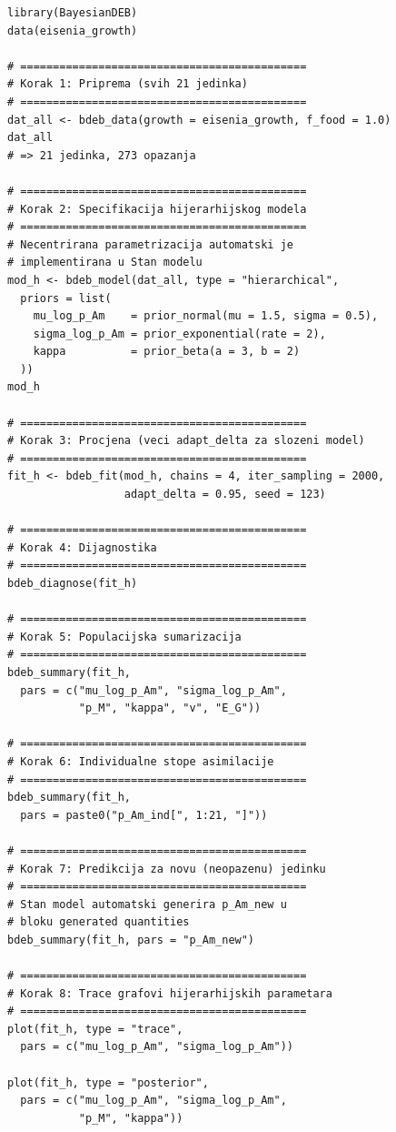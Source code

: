 \documentclass[11pt,a4paper]{article}
\begin{document}
\begin{lstlisting}
library(BayesianDEB)
data(eisenia_growth)

# ============================================
# Korak 1: Priprema (svih 21 jedinka)
# ============================================
dat_all <- bdeb_data(growth = eisenia_growth, f_food = 1.0)
dat_all
# => 21 jedinka, 273 opazanja

# ============================================
# Korak 2: Specifikacija hijerarhijskog modela
# ============================================
# Necentrirana parametrizacija automatski je
# implementirana u Stan modelu
mod_h <- bdeb_model(dat_all, type = "hierarchical",
  priors = list(
    mu_log_p_Am    = prior_normal(mu = 1.5, sigma = 0.5),
    sigma_log_p_Am = prior_exponential(rate = 2),
    kappa          = prior_beta(a = 3, b = 2)
  ))
mod_h

# ============================================
# Korak 3: Procjena (veci adapt_delta za slozeni model)
# ============================================
fit_h <- bdeb_fit(mod_h, chains = 4, iter_sampling = 2000,
                  adapt_delta = 0.95, seed = 123)

# ============================================
# Korak 4: Dijagnostika
# ============================================
bdeb_diagnose(fit_h)

# ============================================
# Korak 5: Populacijska sumarizacija
# ============================================
bdeb_summary(fit_h,
  pars = c("mu_log_p_Am", "sigma_log_p_Am",
           "p_M", "kappa", "v", "E_G"))

# ============================================
# Korak 6: Individualne stope asimilacije
# ============================================
bdeb_summary(fit_h,
  pars = paste0("p_Am_ind[", 1:21, "]"))

# ============================================
# Korak 7: Predikcija za novu (neopazenu) jedinku
# ============================================
# Stan model automatski generira p_Am_new u
# bloku generated quantities
bdeb_summary(fit_h, pars = "p_Am_new")

# ============================================
# Korak 8: Trace grafovi hijerarhijskih parametara
# ============================================
plot(fit_h, type = "trace",
  pars = c("mu_log_p_Am", "sigma_log_p_Am"))

plot(fit_h, type = "posterior",
  pars = c("mu_log_p_Am", "sigma_log_p_Am",
           "p_M", "kappa"))
\end{lstlisting}
\end{document}
